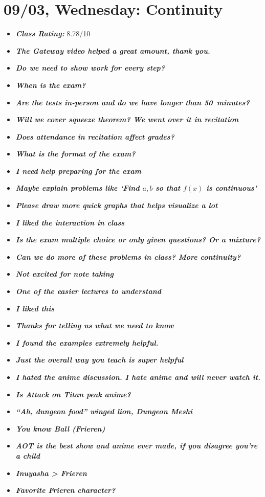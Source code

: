 \documentclass[11pt,letterpaper]{article}
\begin{document}
\section*{09/03, Wednesday: Continuity\label{09-03}}

\begin{itemize}
\item {\bfseries\itshape Class Rating:} 8.78/10
\item {\bfseries\itshape The Gateway video helped a great amount, thank you.}
\item {\bfseries\itshape Do we need to show work for every step?} 
\item {\bfseries\itshape When is the exam?}
\item {\bfseries\itshape Are the tests in-person and do we have longer than 50~minutes?} 
\item {\bfseries\itshape Will we cover squeeze theorem? We went over it in recitation} 
\item {\bfseries\itshape Does attendance in recitation affect grades?}
\item {\bfseries\itshape What is the format of the exam?} 
\item {\bfseries\itshape I need help preparing for the exam}
\item {\bfseries\itshape Maybe explain problems like `Find $a, b$ so that $f(x)$ is continuous'} 
\item {\bfseries\itshape Please draw more quick graphs that helps visualize a lot}
\item {\bfseries\itshape I liked the interaction in class}
\item {\bfseries\itshape Is the exam multiple choice or only given questions? Or a mixture?} 
\item {\bfseries\itshape Can we do more of these problems in class? More continuity?} 
\item {\bfseries\itshape Not excited for note taking} 
\item {\bfseries\itshape One of the easier lectures to understand}
\item {\bfseries\itshape I liked this}
\item {\bfseries\itshape Thanks for telling us what we need to know}
\item {\bfseries\itshape I found the examples extremely helpful.} 
\item {\bfseries\itshape Just the overall way you teach is super helpful} 
\item {\bfseries\itshape I hated the anime discussion. I hate anime and will never watch it.} 
\item {\bfseries\itshape Is Attack on Titan peak anime?}
\item {\bfseries\itshape ``Ah, dungeon food'' winged lion, Dungeon Meshi} 
\item {\bfseries\itshape You know Ball (Frieren)} 
\item {\bfseries\itshape AOT is the best show and anime ever made, if you disagree you're a child} 
\item {\bfseries\itshape Inuyasha > Frieren} 
\item {\bfseries\itshape Favorite Frieren character?} 
\end{itemize}
\end{document}
